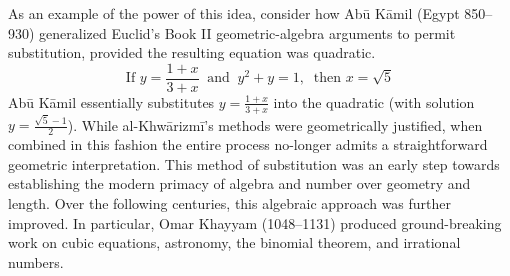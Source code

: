 As an example of the power of this idea, consider how Abū Kāmil (Egypt 850--930) generalized Euclid's Book II geometric-algebra arguments to permit substitution, provided the resulting equation was quadratic.
\[
	\text{If }y=\frac{1+x}{3+x}\ \text{ and }\ y^2+y=1,\ \text{ then }x=\sqrt 5
\]
Abū Kāmil essentially substitutes $y=\frac{1+x}{3+x}$ into the quadratic (with solution $y=\frac{\sqrt 5-1}2$). While al-Khwārizmī's methods were geometrically justified, when combined in this fashion the entire process no-longer admits a straightforward geometric interpretation. This method of substitution was an early step towards establishing the modern primacy of algebra and number over geometry and length.\smallbreak
Over the following centuries, this algebraic approach was further improved. In particular, Omar Khayyam (1048--1131) produced ground-breaking work on cubic equations, astronomy, the binomial theorem, and irrational numbers.


